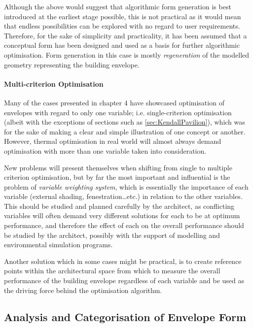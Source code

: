 Although the above would suggest that algorithmic form generation is best introduced at the earliest stage possible, this is not practical as it would mean that endless possibilities can be explored with no regard to user requirements. Therefore, for the sake of simplicity and practicality, it has been assumed that a conceptual form has been designed and used as a basis for further algorithmic optimisation. Form generation in this case is mostly \emph{regeneration} of the modelled geometry representing the building envelope.

\paragraph{Multi-criterion Optimisation} \mbox{}

Many of the cases presented in chapter 4 have showcased optimisation of envelopes with regard to only one variable; i.e. single-criterion optimisation (albeit with the exceptions of sections such as \ref{sec:KendallPavilion}), which was for the sake of making a clear and simple illustration of one concept or another. However, thermal optimisation in real world will almost always demand optimisation with more than one variable taken into consideration.

New problems will present themselves when shifting from single to multiple criterion optimisation, but by far the most important and influential is the problem of \emph{variable weighting system}, which is essentially the importance of each variable (external shading, fenestration\ldots etc.) in relation to the other variables. This should be studied and planned carefully by the architect, as conflicting variables will often demand very different solutions for each to be at optimum performance, and therefore the effect of each on the overall performance should be studied by the architect, possibly with the support of modelling and environmental simulation programs.

Another solution which in some cases might be practical, is to create reference points within the architectural space from which to measure the overall performance of the building envelope regardless of each variable and be used as the driving force behind the optimisation algorithm.

\subsection{Analysis and Categorisation of Envelope Form}

